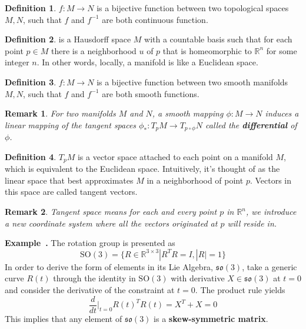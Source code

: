 \documentclass[a4paper]{article}
\theoremstyle{definition}
\newtheorem{definition}{Definition}
\theoremstyle{plain}
\newtheorem{remark}{Remark}
\newenvironment{example}[1][]{\refstepcounter{example}\par\medskip
   \noindent \textbf{Example~\theexample. #1} \rmfamily}{\medskip}
\newcounter{example}{Example}
\begin{document}
\begin{definition}\label{def:homeomorphism}
 $f:M\rightarrow N$ is a bijective function between two topological spaces $M,N$, such that $f$ and $f^{-1}$ are both continuous function.
\end{definition}

\begin{definition}
 is a Hausdorff space $M$ with a countable basis such that for each point $p\in M$ there is a neighborhood $u$ of $p$ that is homeomorphic to $\mathbb{R}^n$ for some integer $n$. In other words, locally, a manifold is like a Euclidean space.
\end{definition}

\begin{definition}\label{def:diffeomorphism}
 $f:M\rightarrow N$ is a bijective function between two smooth manifolds $M, N$, such that $f$ and $f^{-1}$ are both smooth functions.
\end{definition}

\begin{remark}
For two manifolds $M$ and $N$, a smooth mapping $\phi:M\rightarrow N$ induces a linear mapping of the tangent spaces $\phi_*:T_pM\rightarrow T_{p\circ\phi}N$ called the \textbf{differential} of $\phi$.
\end{remark}

\begin{definition}
 $T_pM$ is a vector space attached to each point on a manifold $M$, which is equivalent to the Euclidean space. Intuitively, it's thought of as the linear space that best approximates $M$ in a neighborhood of point $p$. Vectors in this space are called tangent vectors.
\end{definition}

\begin{remark}
Tangent space means for each and every point $p$ in $\mathbb{R}^n$, we introduce a new coordinate system where all the vectors originated at $p$ will reside in.
\end{remark}

\begin{example}
The rotation group is presented as
\begin{equation*}
    \mathrm{SO}(3)=\{R\in \mathbb{R}^{3×3}|R^TR=I,|R|=1\}
\end{equation*}
In order to derive the form of elements in its Lie Algebra, $\mathfrak{so}(3)$, take a generic curve $R(t)$ through the identity in $\mathrm{SO}(3)$ with derivative $X\in\mathfrak{so}(3)$ at $t=0$ and consider the derivative of the constraint at $t=0$. The product rule yields
\begin{equation*}
    \frac{d}{dt}\bigg\rvert_{t=0}R(t)^TR(t)=X^T+X=0
\end{equation*}
This implies that any element of $\mathfrak{so}(3)$ is a \textbf{skew-symmetric matrix}.
\end{example}
\end{document}
